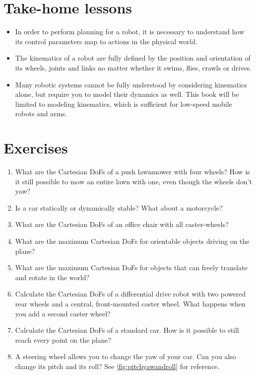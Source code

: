 \section*{Take-home lessons}

\begin{itemize}
\item In order to perform planning for a robot, it is necessary to understand how its control parameters map to actions in the physical world.
\item The kinematics of a robot are fully defined by the position and orientation of its wheels, joints and links no matter whether it swims, flies, crawls or drives.
\item Many robotic systems cannot be fully understood by considering kinematics alone, but require you to model their dynamics as well. This book will be limited to modeling kinematics, which is sufficient for low-speed mobile robots and arms.
\end{itemize}


\section*{Exercises}\small
\begin{enumerate}
\item What are the Cartesian DoFs of a push lawnmower with four wheels? How is it still possible to mow an entire lawn with one, even though the wheels don't yaw?
\item Is a car statically or dynamically stable? What about a motorcycle?
\item What are the Cartesian DoFs of an office chair with all caster-wheels?
\item What are the maximum Cartesian DoFs for orientable objects driving on the plane?
\item What are the maximum Cartesian DoFs for objects that can freely translate and rotate in the world?
\item Calculate the Cartesian DoFs of a differential drive robot with two powered rear wheels and a central, front-mounted caster wheel. What happens when you add a second caster wheel?
\item Calculate the Cartesian DoFs of a standard car. How is it possible to still reach every point on the plane?
\item A steering wheel allows you to change the yaw of your car. Can you also change its pitch and its roll? See \cref{fig:pitchyawandroll} for reference.
\end{enumerate}\normalsize
